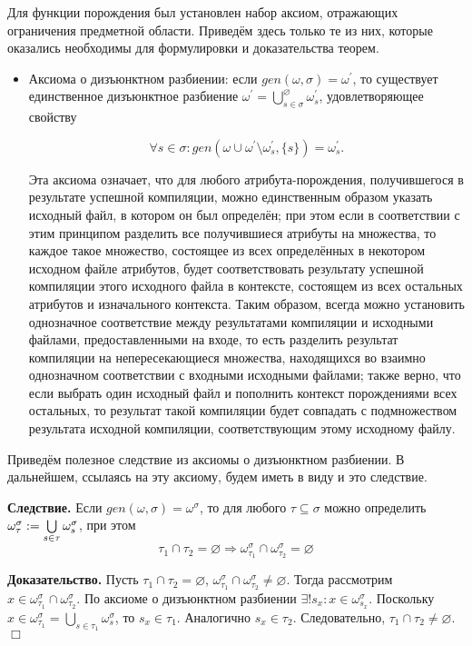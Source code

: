 Для функции порождения был установлен набор аксиом, отражающих ограничения предметной области. Приведём здесь только те из них, которые оказались необходимы для формулировки и доказательства теорем.

\begin{itemize}
	\item Аксиома о дизъюнктном разбиении: если $gen(\omega,\sigma) = \omega^\prime$, то существует единственное дизъюнктное разбиение $\omega^\prime=\bigcup^\varnothing_{s\in\sigma}\omega^\prime_s$, 
	удовлетворяющее свойству 

	$$\forall s\in\sigma : gen(\omega\cup\omega^\prime\setminus\omega^\prime_s,\{s\})=\omega^\prime_s.$$
	
	Эта аксиома означает, что для любого атрибута-порождения, получившегося в результате успешной компиляции, можно единственным образом указать исходный файл, в котором он был определён; при этом если в соответствии с этим принципом разделить все получившиеся атрибуты на множества, то каждое такое множество, состоящее из всех определённых в некотором исходном файле атрибутов, будет соответствовать результату успешной компиляции этого исходного файла в контексте, состоящем из всех остальных атрибутов и изначального контекста. Таким образом, всегда можно установить однозначное соответствие между результатами компиляции и исходными файлами, предоставленными на входе, то есть разделить результат компиляции на непересекающиеся множества, находящихся во взаимно однозначном соответствии с входными исходными файлами; также верно, что если выбрать один исходный файл и пополнить контекст порождениями всех остальных, то результат такой компиляции будет совпадать с подмножеством результата исходной компиляции, соответствующим этому исходному файлу.
\end{itemize}

Приведём полезное следствие из аксиомы о дизъюнктном разбиении. В дальнейшем, ссылаясь на эту аксиому, будем иметь в виду и это следствие.

\textbf{Следствие.}
Если $gen(\omega, \sigma) = \omega^\sigma$, то для любого $\tau \subseteq \sigma$ можно определить $\omega^\sigma_\tau := \bigcup\limits_{s\in\tau}\omega^\sigma_s$, при этом
$$\tau_1 \cap \tau_2 = \varnothing \Rightarrow \omega^\sigma_{\tau_1} \cap \omega^\sigma_{\tau_2} = \varnothing$$

\textbf{Доказательство.} Пусть $\tau_1 \cap \tau_2 = \varnothing$, $\omega^\sigma_{\tau_1} \cap \omega^\sigma_{\tau_2} \neq \varnothing$. Тогда рассмотрим $x \in \omega^\sigma_{\tau_1} \cap \omega^\sigma_{\tau_2}$. По аксиоме о дизъюнктном разбиении $\exists ! s_x: x \in \omega^\sigma_{s_x}$. Поскольку $x \in \omega^\sigma_{\tau_1} = \bigcup\limits_{s\in\tau_1}\omega^\sigma_s$, то $s_x \in \tau_1$. Аналогично $s_x \in \tau_2$. Следовательно, $\tau_1 \cap \tau_2 \neq \varnothing$. $\Box$\\

